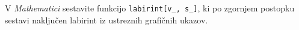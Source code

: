 \documentclass[arhiv]{izpit}
\begin{document}
  V \emph{Mathematici} sestavite funkcijo \texttt{labirint[v\_, s\_]}, ki po
  zgornjem postopku sestavi na\-klju\-čen labirint iz ustreznih grafičnih ukazov.

\end{document}
